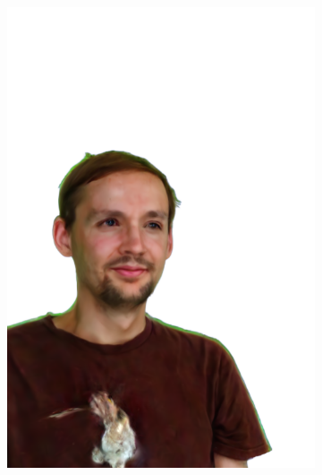 \begin{figure}[ht]
\begin{subfigure}{0.08\linewidth}
        \includegraphics[width=\textwidth]{Figures/results/high/simon_rabbit/11_render.png}
	\end{subfigure}
    \begin{subfigure}{0.08\linewidth}%

\end{subfigure}
\end{figure}
